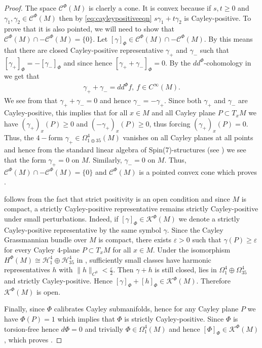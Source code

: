 \documentclass[10pt,a4paper,reqno]{article}
\theoremstyle{definition}
\numberwithin{equation}{section}
\def\ddphi{dd^{\Phi}}
\def\cC{\mathcal{C}}
\def\cH{\mathcal{H}}
\def\cK{\mathcal{K}}
\begin{document}
\begin{proof}
The space $\cC^{\Phi}(M)$ is claerly a cone. It is convex because if $s, t\geq 0$ and $\gamma_1, \gamma_2\in \cC^{\Phi}(M)$ then by \cref{eq:cayleypositiveeqn} $s\gamma_1+t\gamma_2$ is Cayley-positive. To prove that it is also pointed, we will need to show that $\cC^{\Phi}(M)\cap -\cC^{\Phi}(M)=\{0\}$. Let $[\gamma]_{\Phi}\in \cC^{\Phi}(M)\cap -\cC^{\Phi}(M)$. By  this means that there are closed Cayley-positive representative $\gamma_+$ and $\gamma_-$ such that $[\gamma_+]_{\Phi}=-[\gamma_-]_{\Phi}$ and since hence $[\gamma_++\gamma_-]_{\Phi}=0$. By the $\ddphi$-cohomology in  we get that
\begin{align*}
\gamma_++\gamma_-=\ddphi f,\ f\in C^{\infty}(M).
\end{align*}
We see from  that $\gamma_++\gamma_-=0$ and hence $\gamma_-=-\gamma_+$. Since both $\gamma_+$  and $\gamma_-$ are Cayley-positive, this implies that for all $x\in M$ and all Cayley plane $P\subset T_xM$ we have $(\gamma_+)_x(P)\geq 0$ and $(-\gamma_+)_x(P)\geq 0$, thus forcing $(\gamma_+)_x(P)=0$. Thus, the $4-$form $\gamma_+\in \Omega^4_{1\oplus 35}(M)$ vanishes on all Cayley planes at all points and hence from the standard linear algebra of Spin(7)-structures (see ) we see that the form $\gamma_+=0$ on $M$. Similarly, $\gamma_-=0$ on $M$. Thus, $\cC^{\Phi}(M)\cap -\cC^{\Phi}(M)=\{0\}$ and $\cC^{\Phi}(M)$ is a pointed convex cone which proves .

\medskip

 follows from the fact that strict positivity is an open condition and since $M$ is compact, a strictly Cayley-positive representative remains strictly Cayley-positive under small perturbations. Indeed, if $[\gamma]_\Phi\in \cK^\Phi(M)$ we denote a strictly Cayley-positive representative by the same symbol $\gamma$. Since the Cayley Grassmannian bundle over $M$ is compact, there exists $\varepsilon>0$ such that $\gamma(P)\geq\varepsilon$ for every Cayley $4$-plane $P\subset T_xM$ for all $x\in M$. Under the isomorphism $H^\Phi(M)\cong \cH^4_1\oplus\cH^4_{35}$ in , sufficiently small classes have harmonic representatives $h$ with $\|h\|_{C^0}<\frac{\varepsilon}{2}$. Then $\gamma+h$ is still closed, lies in $\Omega^4_1\oplus\Omega^4_{35}$ and strictly Cayley-positive. Hence $[\gamma]_\Phi+[h]_\Phi\in \cK^\Phi(M)$. Therefore $\cK^\Phi(M)$ is open.

\medskip

Finally, since $\Phi$ calibrates Cayley submanifolds, hence for any Cayley plane $P$ we have $\Phi(P)=1$ which implies that $\Phi$ is strictly Cayley-positive. Since $\Phi$ is torsion-free hence $d\Phi=0$ and trivially $\Phi\in \Omega^4_1(M)$ and hence $[\Phi]_{\Phi}\in \cK^{\Phi}(M)$, which proves .
\end{proof}
\end{document}
